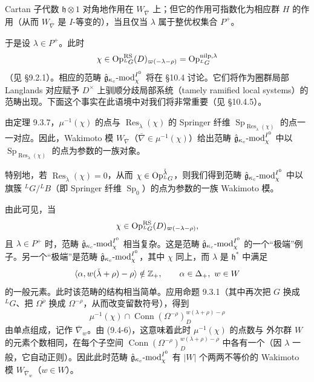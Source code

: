 
Cartan 子代数 $\mathfrak{h}\otimes1$ 对角地作用在 $W_{\overline{\nabla}}$ 上；但它的作用可指数化为相应群 $H$ 的作用（从而 $W_{\overline{\nabla}}$ 是 $I$-等变的），当且仅当 $\lambda$ 属于整优权集合 $P^+$。

于是设 $\lambda\in P^+$。此时
\[
    \chi\in\operatorname{Op}^{\mathrm{RS}}_{{}^LG}(D)_{\varpi(-\lambda-\rho)}=\operatorname{Op}^{\mathrm{nilp},\lambda}_{{}^LG}
\]
（见 §9.2.1）。相应的范畴 $\hat{\mathfrak{g}}_{\kappa_c}\text{-mod}^{I^0}_\chi$ 将在 §10.4 讨论。它们将作为圈群局部 Langlands 对应赋予 $D^\times$ 上驯顺分歧局部系统（tamely ramified local systems）的范畴出现。下面这个事实在此语境中对我们将非常重要（见 §10.4.5）。

由定理 9.3.7，$\mu^{-1}(\chi)$ 的点与 $\operatorname{Res}_{\check\lambda}(\chi)$ 的 Springer 纤维 $\operatorname{Sp}_{\operatorname{Res}_{\check\lambda}(\chi)}$ 的点一一对应。因此，Wakimoto 模 $W_{\overline{\nabla}}$（$\overline{\nabla}\in\mu^{-1}(\chi)$）给出范畴 $\hat{\mathfrak{g}}_{\kappa_c}\text{-mod}^{I^0}_\chi$ 中以 $\operatorname{Sp}_{\operatorname{Res}_{\check\lambda}(\chi)}$ 的点为参数的一族对象。

特别地，若 $\operatorname{Res}_{\check\lambda}(\chi)=0$，从而 $\chi\in\operatorname{Op}^{\check\lambda}_{{}^LG}$，则我们得到范畴 $\hat{\mathfrak{g}}_{\kappa_c}\text{-mod}^{I^0}_\chi$ 中以旗簇 ${}^LG/{}^LB$（即 Springer 纤维 $\operatorname{Sp}_0$）的点为参数的一族 Wakimoto 模。

由此可见，当
\[
    \chi\in\operatorname{Op}^{\mathrm{RS}}_{{}^LG}(D)_{\varpi(-\lambda-\rho)},
\]
且 $\lambda\in P^+$ 时，范畴 $\hat{\mathfrak{g}}_{\kappa_c}\text{-mod}^{I^0}_\chi$ 相当复杂。这是范畴 $\hat{\mathfrak{g}}_{\kappa_c}\text{-mod}^{I^0}_\chi$ 的一个“极端”例子。另一个“极端”是范畴 $\hat{\mathfrak{g}}_{\kappa_c}\text{-mod}^{I^0}_\chi$，其中 $\chi$ 同上，而 $\lambda$ 是 $\mathfrak{h}^*$ 中满足
\[
    \langle\alpha,w(\check\lambda+\rho)-\rho\rangle\notin\mathbb{Z}_+,
    \qquad \alpha\in\Delta_+,\ w\in W
\]
的一般元素。此时该范畴的结构相当简单。应用命题 9.3.1（其中再次把 $G$ 换成 ${}^LG$、把 $\Omega^{\check\rho}$ 换成 $\Omega^{-\rho}$，从而改变留数符号），得到
\[
    \mu^{-1}(\chi)\cap\operatorname{Conn}(\Omega^{-\rho})^{w(\lambda+\rho)-\rho}_D
\]
由单点组成，记作 $\overline{\nabla}_w$。由 (9.4-6)，这意味着此时 $\mu^{-1}(\chi)$ 的点数与 外尔群 $W$ 的元素个数相同，在每个子空间 $\operatorname{Conn}(\Omega^{-\rho})^{w(\lambda+\rho)-\rho}_D$ 中各有一个（因 $\lambda$ 一般，它自动正则）。因此此时范畴 $\hat{\mathfrak{g}}_{\kappa_c}\text{-mod}^{I^0}_\chi$ 有 $|W|$ 个两两不等价的 Wakimoto 模 $W_{\overline{\nabla}_w}$（$w\in W$）。

